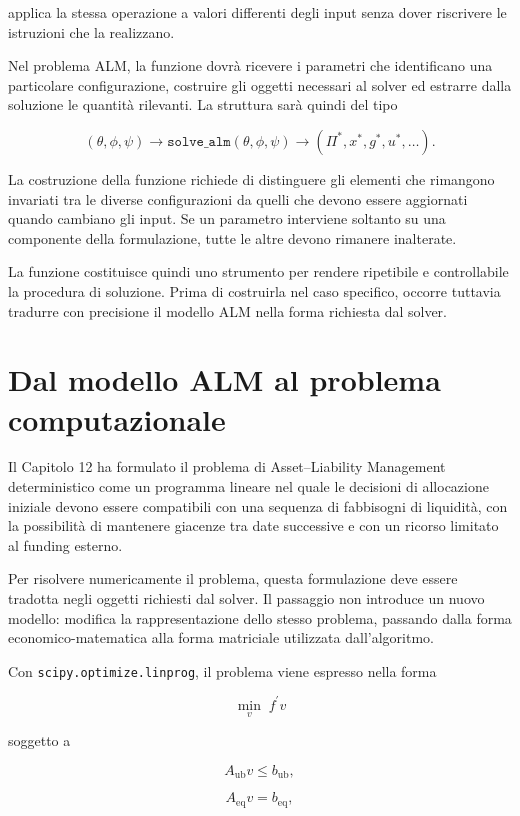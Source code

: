 \noindent applica la stessa operazione a valori differenti degli input senza
dover riscrivere le istruzioni che la realizzano.

Nel problema ALM, la funzione dovr\`a ricevere i parametri che identificano
una particolare configurazione, costruire gli oggetti necessari al solver ed
estrarre dalla soluzione le quantit\`a rilevanti. La struttura sar\`a quindi
del tipo

$$
(\theta,\phi,\psi)
\longrightarrow
\texttt{solve\_alm}(\theta,\phi,\psi)
\longrightarrow
(\Pi^*,x^*,g^*,u^*,\ldots).
$$

La costruzione della funzione richiede di distinguere gli elementi che
rimangono invariati tra le diverse configurazioni da quelli che devono essere
aggiornati quando cambiano gli input. Se un parametro interviene soltanto su
una componente della formulazione, tutte le altre devono rimanere
inalterate.

La funzione costituisce quindi uno strumento per rendere ripetibile e
controllabile la procedura di soluzione. Prima di costruirla nel caso
specifico, occorre tuttavia tradurre con precisione il modello ALM nella forma
richiesta dal solver.


\section{Dal modello ALM al problema computazionale}

Il Capitolo 12 ha formulato il problema di Asset--Liability Management
deterministico come un programma lineare nel quale le decisioni di
allocazione iniziale devono essere compatibili con una sequenza di fabbisogni
di liquidit\`a, con la possibilit\`a di mantenere giacenze tra date successive
e con un ricorso limitato al funding esterno.

Per risolvere numericamente il problema, questa formulazione deve essere
tradotta negli oggetti richiesti dal solver. Il passaggio non introduce un
nuovo modello: modifica la rappresentazione dello stesso problema, passando
dalla forma economico-matematica alla forma matriciale utilizzata
dall'algoritmo.

Con \texttt{scipy.optimize.linprog}, il problema viene espresso nella forma

\[
\min_{v}\; f^{\prime}v
\]

\noindent soggetto a

\[
A_{\mathrm{ub}}v\leq b_{\mathrm{ub}},
\]

\[
A_{\mathrm{eq}}v=b_{\mathrm{eq}},
\]

